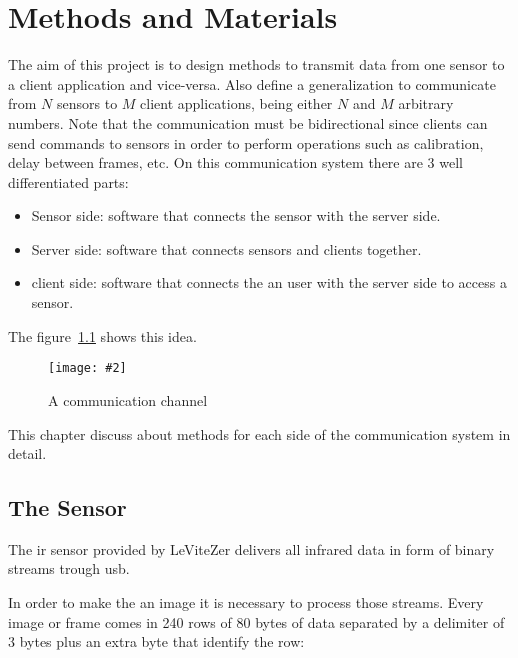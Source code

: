 \documentclass[hidelinks,11pt,a4paper,oneside,article]{memoir}
\newcommand{\putimage}[3][10] %
{
\begin{figure}[h]
	\centering
	\captionsetup{justification=centering}
	\texttt{[image: \#2]}
	\caption{#3}
	\label{fig:#2}
\end{figure}
}
\begin{document}
\clearpage\chapter{Methods and Materials}\label{sec:methods-and-materials}

The aim of this project is to design methods to transmit data from one sensor to a client application and vice-versa. Also define a generalization to communicate from $N$ sensors to $M$ client applications, being either $N$ and $M$ arbitrary numbers. Note that the communication must be bidirectional since clients can send commands to sensors in order to perform operations such as calibration, delay between frames, etc. On this communication system there are 3 well differentiated parts:
\begin{itemize}
    \item Sensor side: software that connects the sensor with the server side.
    \item Server side: software that connects sensors and clients together.
    \item client side: software that connects the an user with the server side to access a sensor.
\end{itemize}

The figure~\ref{fig:communication-channel} shows this idea.

\putimage{communication-channel}{A communication channel}

This chapter discuss about methods for each side of the communication system in detail.


\section{The Sensor}
The \gls{ir} sensor provided by LeViteZer delivers all infrared data in form of binary streams trough \gls{usb}.

 In order to make the an image it is necessary to process those streams. Every image or frame comes in 240 rows of 80 bytes of data separated by a delimiter of 3 bytes plus an extra byte that identify the row:
\end{document}
